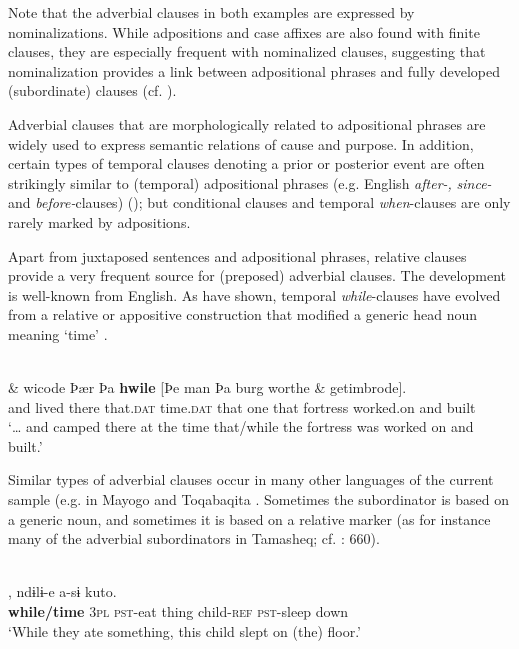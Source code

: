 \documentclass[output=paper]{langsci/langscibook}
\begin{document}
Note that the adverbial clauses in both examples are expressed by nominalizations. While adpositions and case affixes are also found with finite clauses, they are especially frequent with nominalized clauses, suggesting that nominalization provides a link between adpositional phrases and fully developed (subordinate) clauses (cf. \citealt{Deutscher2009,Heine2009}).

Adverbial clauses that are morphologically related to adpositional phrases are widely used to express semantic relations of cause and purpose. In addition, certain types of temporal clauses denoting a prior or posterior event are often strikingly similar to (temporal) adpositional phrases (e.g. English \textit{after-,} \textit{since-} and \textit{before-}clauses) (\citealt{Blake1999,Hetterle2015}); but conditional clauses and temporal \textit{when}-clauses are only rarely marked by adpositions. 

Apart from juxtaposed sentences and adpositional phrases, relative clauses provide a very frequent source for (preposed) adverbial clauses. The development is well-known from English. As \citet{HopperTraugott2003} have shown, temporal \textit{while}-clauses have evolved from a relative or appositive construction that modified a generic head noun meaning ‘time’ .

\ea\label{ex:diessel:9}
\\
\gll   \& wicode    Þær   Þa   \textbf{hwile}  [Þe   man  Þa   burg  worthe  \& getimbrode].\\
       and  lived   there   that.\textsc{dat}   time.\textsc{dat}  that   one  that   fortress  worked.on  and built\\
\glt `… and camped there at the time that/while the fortress was worked on and built.'
\z

Similar types of adverbial clauses occur in many other languages of the current sample (e.g. in Mayogo  and Toqabaqita . Sometimes the subordinator is based on a generic noun, and sometimes it is based on a relative marker (as for instance many of the adverbial subordinators in Tamasheq; cf. \citealt{Heath2005}: 660). 

\ea\label{ex:diessel:10}
\\
,   ndɨlɨ-e   a-sɨ   kuto.\\
        \textbf{while/time} \textsc{3pl}   \textsc{pst-}eat   thing   child-\textsc{ref}   \textsc{pst-}sleep   down\\
\glt   `While they ate something, this child slept on (the) floor.'
\z
\end{document}
